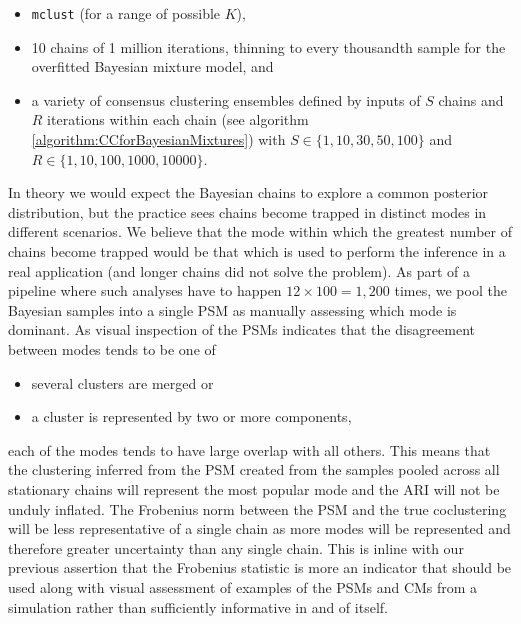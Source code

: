 \documentclass{bioinfo}
\begin{document}
\begin{itemize}
	\item \texttt{mclust} (for a range of possible $K$),
	\item 10 chains of 1 million iterations, thinning to every thousandth sample for the overfitted Bayesian mixture model, and
	\item a variety of consensus clustering ensembles defined by inputs of $S$ chains and $R$ iterations within each chain (see algorithm \ref{algorithm:CCforBayesianMixtures}) with $S \in \{1, 10, 30, 50, 100\}$ and $R \in \{1, 10, 100, 1000, 10000\}$.
\end{itemize}
In theory we would expect the Bayesian chains to explore a common posterior distribution, but the practice sees chains become trapped in distinct modes in different scenarios. We believe that the mode within which the greatest number of chains become trapped would be that which is used to perform the inference in a real application (and longer chains did not solve the problem). As part of a pipeline where such analyses have to happen $12 \times 100 = 1,200$ times, we pool the Bayesian samples into a single PSM as manually assessing which mode is dominant. As visual inspection of the PSMs indicates that the disagreement between modes tends to be one of 
\begin{itemize}
	\item several clusters are merged or
	\item a cluster is represented by two or more components,
\end{itemize}
each of the modes tends to have large overlap with all others. This means that the clustering inferred from the PSM created from the samples pooled across all stationary chains will represent the most popular mode and the ARI will not be unduly inflated. The Frobenius norm between the PSM and the true coclustering will be less representative of a single chain as more modes will be represented and therefore greater uncertainty than any single chain. This is inline with our previous assertion that the Frobenius statistic is more an indicator that should be used along with visual assessment of examples of the PSMs and CMs from a simulation rather than sufficiently informative in and of itself.



\end{document}
